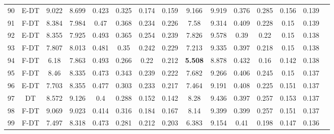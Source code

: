 \begin{longtable}{@{\hskip3pt}c@{\hskip3pt}c@{\hskip3pt}c@{\hskip3pt}c@{\hskip3pt}c@{\hskip3pt}c@{\hskip3pt}c@{\hskip3pt}c@{\hskip3pt}c@{\hskip3pt}c@{\hskip3pt}c@{\hskip3pt}c@{\hskip3pt}c@{\hskip3pt}c@{\hskip3pt}c}
         90 &           E-DT &             9.022 &       8.699 &           0.423 &           0.325 &           0.174 &           0.159 &               9.166 &       9.919 &           0.376 &         0.285 &          0.156 &           0.139 \\
         91 &           F-DT &             8.384 &       7.984 &            0.47 &           0.368 &           0.234 &           0.226 &                7.58 &       9.314 &           0.409 &         0.228 &           0.15 &           0.139 \\
         92 &           E-DT &             8.355 &       7.925 &           0.493 &           0.365 &           0.254 &           0.239 &               7.826 &       9.578 &            0.39 &          0.22 &           0.15 &           0.138 \\
         93 &           F-DT &             7.807 &       8.013 &           0.481 &            0.35 &           0.242 &           0.229 &               7.213 &       9.335 &           0.397 &         0.218 &           0.15 &           0.138 \\
         94 &           F-DT &              6.18 &       7.863 &           0.493 &           0.266 &            0.22 &           0.212 &      \textbf{5.508} &       8.878 &           0.432 &          0.16 &          0.142 &           0.138 \\
         95 &           F-DT &              8.46 &       8.335 &           0.473 &           0.343 &           0.239 &           0.222 &               7.682 &       9.266 &           0.406 &         0.245 &           0.15 &           0.137 \\
         96 &           E-DT &             7.703 &       8.355 &           0.477 &           0.303 &           0.233 &           0.217 &               7.464 &       9.191 &           0.408 &         0.225 &          0.151 &           0.137 \\
         97 &             DT &             8.572 &       9.126 &             0.4 &           0.288 &           0.152 &           0.142 &                8.28 &       9.436 &           0.397 &         0.257 &          0.153 &           0.137 \\
         98 &           F-DT &             9.069 &       9.023 &           0.414 &           0.316 &           0.184 &           0.167 &                8.14 &       9.399 &           0.399 &         0.257 &          0.151 &           0.137 \\
         99 &           F-DT &             7.497 &       8.318 &           0.473 &           0.281 &           0.212 &           0.203 &               6.383 &       9.154 &            0.41 &         0.198 &          0.147 &           0.136 \\

\end{longtable}
